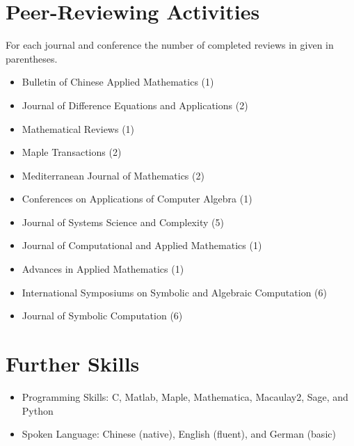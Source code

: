 \documentclass[a4paper,12pt]{article}
\begin{document}
\section*{\Large Peer-Reviewing Activities}
For each journal and conference the number of completed reviews in given in parentheses.
\begin{itemize}
\item Bulletin of Chinese Applied Mathematics (1)
\item Journal of Difference Equations and Applications (2)
\item Mathematical Reviews (1)
\item Maple Transactions (2)
\item Mediterranean Journal of Mathematics (2)
\item Conferences on Applications of Computer Algebra (1)
 \item Journal of Systems Science and Complexity (5)
 \item Journal of Computational and Applied Mathematics (1)
 \item Advances in Applied Mathematics (1)
 \item International Symposiums on Symbolic and Algebraic Computation (6)
 \item Journal of Symbolic Computation (6)
\end{itemize}

\section*{\Large{Further Skills}}
\begin{itemize}
 \item Programming Skills: C, Matlab, Maple, Mathematica, Macaulay2, Sage, and Python
 \item Spoken Language: Chinese (native), English (fluent), and German (basic)
\end{itemize}

\end{document}
